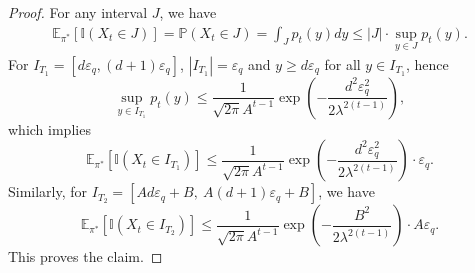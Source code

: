 \documentclass{article}
\begin{document}
\begin{proof}
For any interval $J$, we have
\begin{align*}
\mathbb E_{\pi^*}\left[\mathbb I(X_t\in J)\right]
=\mathbb P(X_t\in J)=\int_J p_t(y)dy
\le |J|\cdot \sup_{y\in J}p_t(y).
\end{align*}
For $I_{T_1}=[d\varepsilon_q,(d+1)\varepsilon_q]$, $|I_{T_1}|=\varepsilon_q$ and $y\ge d\varepsilon_q$ for all $y\in I_{T_1}$, hence
\begin{equation*}
\sup_{y\in I_{T_1}}p_t(y)\le \frac{1}{\sqrt{2\pi}A^{t-1}}
\exp\left(-\frac{d^2\varepsilon_q^2}{2\lambda^{2(t-1)}}\right),
\end{equation*}
which implies
\begin{equation*}
\mathbb E_{\pi^*}\left[\mathbb I(X_t\in I_{T_1})\right]
\le \frac{1}{\sqrt {2\pi}A^{t-1}}
\exp\left(-\frac{d^2\varepsilon_q^2}{2 \lambda^{2(t-1)}}\right)\cdot\varepsilon_q.
\end{equation*}
Similarly, for $I_{T_2}=[Ad\varepsilon_q+B,\ A(d+1)\varepsilon_q+B]$, we have
\begin{equation*}
\mathbb E_{\pi^*}\left[\mathbb I(X_t\in I_{T_2})\right]
\le \frac{1}{\sqrt {2\pi}A^{t-1}}
\exp\left(-\frac{B^2}{2\lambda^{2(t-1)}}\right)\cdot A\varepsilon_q.
\end{equation*}
This proves the claim.
\end{proof}
\end{document}
